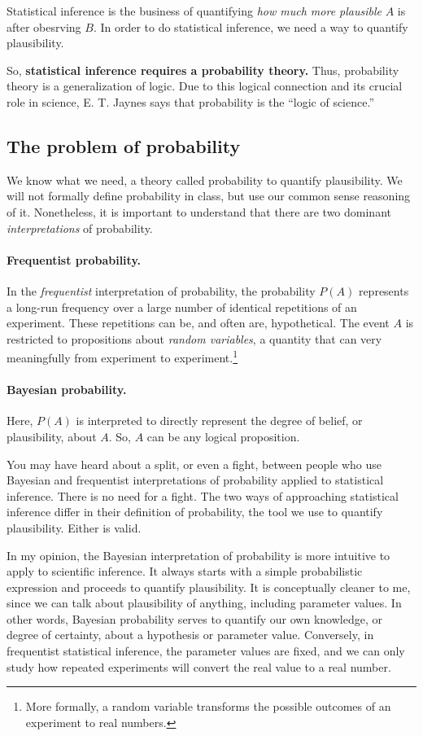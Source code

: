Statistical inference is the business of quantifying \textit{how
  much more plausible} $A$ is after obesrving $B$. In order to do statistical inference, we need a way to quantify plausibility.

So, \textbf{statistical inference requires a probability theory.}
Thus, probability theory is a generalization of logic.  Due to this
logical connection and its crucial role in science, E. T. Jaynes says
that probability is the ``logic of science.''


\subsection{The problem of probability}
We know what we need, a theory called probability to quantify
plausibility.  We will not formally define probability in class, but
use our common sense reasoning of it.  Nonetheless, it is important to
understand that there are two dominant \textit{interpretations} of probability.

\paragraph{Frequentist probability.}  In the \textit{frequentist}
interpretation of probability, the probability $P(A)$ represents a
long-run frequency over a large number of identical repetitions of an
experiment.  These repetitions can be, and often are, hypothetical.
The event $A$ is restricted to propositions about \textit{random
  variables}, a quantity that can very meaningfully from experiment to
experiment.\footnote{More formally, a random variable transforms the
  possible outcomes of an experiment to real numbers.}

\paragraph{Bayesian probability.} Here, $P(A)$ is interpreted to directly represent the
degree of belief, or plausibility, about $A$.  So, $A$ can be any
logical proposition.

You may have heard about a split, or even a fight, between people who
use Bayesian and frequentist interpretations of probability applied to statistical inference.  There is no need
for a fight.  The two ways of approaching statistical inference differ
in their definition of probability, the tool we use to quantify
plausibility.  Either is valid.

In my opinion, the Bayesian interpretation of probability is more
intuitive to apply to scientific inference.  It always starts with a
simple probabilistic expression and proceeds to quantify plausibility.
It is conceptually cleaner to me, since we can talk about plausibility
of anything, including parameter values.  In other words, Bayesian
probability serves to quantify our own knowledge, or degree of
certainty, about a hypothesis or parameter value.  Conversely, in
frequentist statistical inference, the parameter values are fixed, and
we can only study how repeated experiments will convert the real value
to a real number.

